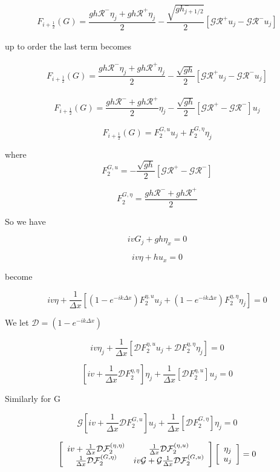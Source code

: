 \documentclass[12pt]{article}
\begin{document}
\begin{multline}
F_{i+\frac{1}{2}}(G) = \dfrac{ gh\mathcal{R}^-\eta_{j} + gh\mathcal{R}^+\eta_{j}}{ 2}  - \dfrac{ \sqrt{g h^-_{j + 1/2}}}{ 2} \left [ \mathcal{G}\mathcal{R}^+u_{j} - \mathcal{G}\mathcal{R}^-u_{j} \right ]
\end{multline}

up to order the last term becomes

\begin{multline}
F_{i+\frac{1}{2}}(G) = \dfrac{ gh\mathcal{R}^-\eta_{j} + gh\mathcal{R}^+\eta_{j}}{ 2}  - \dfrac{ \sqrt{g h}}{ 2} \left [ \mathcal{G}\mathcal{R}^+u_{j} - \mathcal{G}\mathcal{R}^-u_{j} \right ]
\end{multline}

\begin{multline}
F_{i+\frac{1}{2}}(G) = \dfrac{ gh\mathcal{R}^- + gh\mathcal{R}^+}{ 2} \eta_{j}  - \dfrac{ \sqrt{g h}}{ 2} \left [ \mathcal{G}\mathcal{R}^+ - \mathcal{G}\mathcal{R}^- \right ]u_{j}
\end{multline}

\[F_{i+\frac{1}{2}}(G) = F^{G,u}_2 u_{j} + F^{G,\eta}_2 \eta_{j}\]

where
\[ F^{G,u}_2 = - \dfrac{ \sqrt{g h}}{ 2} \left [ \mathcal{G}\mathcal{R}^+ - \mathcal{G}\mathcal{R}^- \right ]\]

\[ F^{G,\eta}_2 = \dfrac{ gh\mathcal{R}^- + gh\mathcal{R}^+}{ 2}\]

So we have

\[ ivG_j  + gh \eta_x  = 0\]

\[iv\eta + h u_x = 0\]

become

\[iv\eta + \frac{1}{\Delta x}\left[(1 - e^{-ik\Delta x})F^{\eta,u}_2 u_{j} + (1 - e^{-ik\Delta x})F^{\eta,\eta}_2 \eta_{j} \right]  = 0\]

We let $\mathcal{D} = (1 - e^{-ik\Delta x})$

\[iv\eta_j + \frac{1}{\Delta x}\left[\mathcal{D}F^{\eta,u}_2 u_{j} + \mathcal{D}F^{\eta,\eta}_2 \eta_{j} \right]  = 0\]

\[\left[iv + \frac{1}{\Delta x}\mathcal{D}F^{\eta,\eta}_2\right]\eta_j + \frac{1}{\Delta x}\left[\mathcal{D}F^{\eta,u}_2 \right] u_{j}   = 0\]

Similarly for G

\[\mathcal{G}\left[iv + \frac{1}{\Delta x}\mathcal{D}F^{G,u}_2\right]u_j + \frac{1}{\Delta x}\left[\mathcal{D}F^{G,\eta}_2 \right] \eta_{j}   = 0\]


\[ \left[\begin{array}{c c}
iv + \frac{1}{\Delta x} \mathcal{D}\mathcal{F}_2^{(\eta,\eta)}  & \frac{1}{\Delta x} \mathcal{D}\mathcal{F}_2^{(\eta,u)}\\
\frac{1}{\Delta x} \mathcal{D}\mathcal{F}_2^{(G,\eta)} &
iv\mathcal{G} + \mathcal{G} \frac{1}{\Delta x} \mathcal{D}\mathcal{F}_2^{(G,u)} 
\end{array} \right] 
\left[\begin{array}{c}
\eta_j \\
u_j
\end{array} \right] = 0\]
\end{document}
